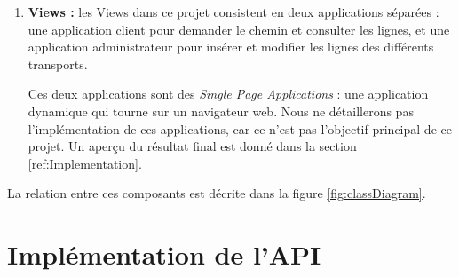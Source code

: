 \begin{enumerate}
	\item \textbf{Views :} les Views dans ce projet consistent en deux applications séparées : une application client pour demander le chemin et consulter les lignes, et une application administrateur pour insérer et modifier les lignes des différents transports.
	      
	      Ces deux applications sont des \emph{Single Page Applications} : une application dynamique qui tourne sur un navigateur web.
	      Nous ne détaillerons pas l'implémentation de ces applications, car ce n'est pas l'objectif principal de ce projet. Un aperçu du résultat final est donné dans la section \ref{ref:Implementation}.
\end{enumerate}
La relation entre ces composants est décrite dans la figure \ref{fig:classDiagram}.
	
	
\section{Implémentation de l'API}
\label{ref:API}
